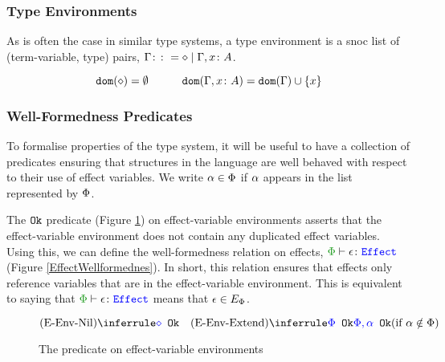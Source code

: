 \documentclass{Report}
\begin{document}
\subsubsection{Type Environments}
As is often the case in similar type systems, a type environment is a snoc list of (term-variable, type) pairs, $\G \gens \nil \mid \gax$.

\begin{framed}
    \begin{definition}
        \[
        \dom{\nil} = \emptyset
        \quad\quad\quad
        \dom{\gax} =  \dom{\G}  \cup \left\{x \right\}
    \]
    
    \end{definition}      
\end{framed}


\subsubsection{Well-Formedness Predicates}


To formalise properties of the type system, it will be useful to have a collection of predicates ensuring that structures in the language are well behaved with respect to their use of effect variables. We write $\a \in \P$ if $\a$ appears in the list represented by $\P$.

The $\okt$ predicate (Figure \ref{EffectEnvOk}) on effect-variable environments asserts that the effect-variable environment does not contain any duplicated effect variables. Using this, we can define the well-formedness relation on effects, $\wellformedeffect{\P}{\e}$ (Figure \ref{EffectWellformednes}). In short, this relation ensures that effects only reference variables that are in the effect-variable environment. This is equivalent to saying that $\wellformedeffect{\P}{\e}$ means that $\e\in E_\P$.

\begin{figure}[H]
    \centering
    \begin{framed}
        \[
    \ntreerulez{\pnil}{\ok{\nil}}
\quad
    \condtreeruleI{\pextend}{\ok{\P}}{\ok{\P, \a}}{\a\notin \P}
\]
    \end{framed}
    
    \caption{The \okt\s predicate on effect-variable environments}
    \label{EffectEnvOk}
\end{figure}
\end{document}
